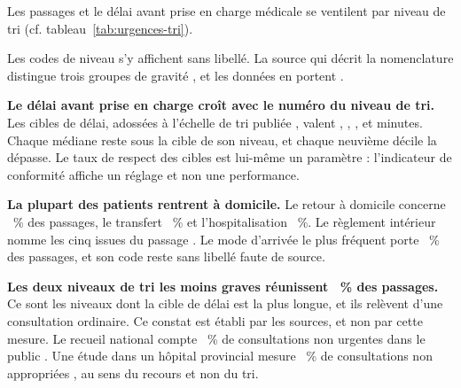 Les passages et le délai avant prise en charge médicale se ventilent par niveau de tri (cf.
tableau~\ref{tab:urgences-tri}).

\begin{table}[htbp]
\centering
\caption{Passages et délai avant prise en charge médicale, par niveau de tri}\label{tab:urgences-tri}
\footnotesize
{}
\end{table}

Les  codes de niveau s'y affichent sans libellé. La source qui décrit la nomenclature distingue
trois groupes de gravité \cite{s12}, et les données en portent .

\textbf{Le délai avant prise en charge croît avec le numéro du niveau de tri.} Les
cibles de délai, adossées à l'échelle de tri publiée \cite{s14}, valent
, , ,
 et  minutes. Chaque médiane reste sous
la cible de son niveau, et chaque neuvième décile la dépasse. Le taux de respect des cibles est
lui-même un paramètre : l'indicateur de conformité affiche un réglage et non une performance.

\textbf{La plupart des patients rentrent à domicile.} Le retour à domicile concerne
~\% des passages, le transfert
~\% et l'hospitalisation
~\%. Le règlement intérieur nomme les cinq issues du
passage \cite{s27}. Le mode d'arrivée le plus fréquent porte
~\% des passages, et son code reste sans libellé faute
de source.

\textbf{Les deux niveaux de tri les moins graves réunissent
~\% des passages.} Ce sont les niveaux dont la
cible de délai est la plus longue, et ils relèvent d'une consultation ordinaire. Ce constat est établi
par les sources, et non par cette mesure. Le recueil national compte
~\% de consultations non urgentes dans le public \cite{s12}. Une
étude dans un hôpital provincial mesure ~\% de
consultations non appropriées \cite{s13}, au sens du recours et non du tri.

